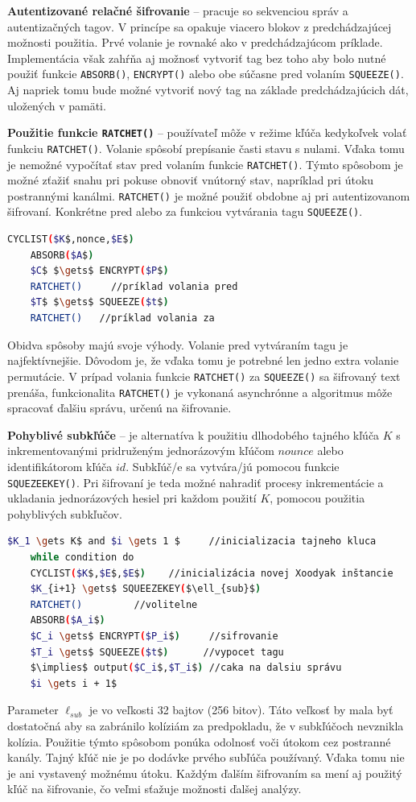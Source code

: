 \textbf{Autentizované relačné šifrovanie} -- pracuje so sekvenciou správ a autentizačných tagov. V princípe sa opakuje viacero blokov z predchádzajúcej možnosti použitia. Prvé volanie je rovnaké ako v predchádzajúcom príklade. Implementácia však zahŕňa aj možnosť vytvoriť tag bez toho aby bolo nutné použiť funkcie
\lstinline|ABSORB()|, \lstinline|ENCRYPT()| alebo obe súčasne pred volaním \lstinline|SQUEEZE()|. Aj napriek tomu bude možné vytvoriť nový tag na základe predchádzajúcich dát, uložených v pamäti. 	

\textbf{Použitie funkcie \lstinline|RATCHET()|} -- používateľ môže v režime kľúča kedykoľvek volať funkciu \lstinline|RATCHET()|. Volanie spôsobí prepísanie časti stavu s nulami. Vďaka tomu je nemožné vypočítať stav pred volaním funkcie \lstinline|RATCHET()|. Týmto spôsobom je možné zťažiť snahu pri pokuse obnoviť vnútorný stav, napríklad pri útoku postrannými kanálmi. \lstinline|RATCHET()| je možné použiť obdobne aj pri autentizovanom šifrovaní. Konkrétne pred alebo za funkciou vytvárania tagu \lstinline|SQUEEZE()|. 
\begin{lstlisting}[language=bash,mathescape=true]
	CYCLIST($K$,nonce,$E$)
	ABSORB($A$)
	$C$ $\gets$ ENCRYPT($P$)
	RATCHET()	  //príklad volania pred
	$T$ $\gets$ SQUEEZE($t$)
	RATCHET()   //príklad volania za
\end{lstlisting} 
Obidva spôsoby majú svoje výhody. Volanie pred vytváraním tagu je najfektívnejšie. Dôvodom je, že vďaka tomu je potrebné len jedno extra volanie permutácie. V prípad volania funkcie \lstinline|RATCHET()| za \lstinline|SQUEEZE()| sa šifrovaný text prenáša, funkcionalita \lstinline|RATCHET()| je vykonaná asynchrónne a algoritmus môže spracovať ďalšiu správu, určenú na šifrovanie. 

\textbf{Pohyblivé subkľúče} -- je alternatíva k použitiu dlhodobého tajného kľúča $K$ s inkrementovanými pridruženým jednorázovým kľúčom $nounce$ alebo identifikátorom kľúča $id$. Subkľúč/e sa vytvára/jú pomocou funkcie \lstinline|SQUEZEEKEY()|. Pri šifrovaní je teda možné nahradiť procesy inkrementácie a ukladania jednorázových hesiel pri každom použití  $K$, pomocou použitia pohyblivých subkľučov.\newpage
\begin{lstlisting}[language=bash,mathescape=true]
	$K_1 \gets K$ and $i \gets 1 $	   //inicializacia tajneho kluca
	while condition do 
	CYCLIST($K$,$E$,$E$)	//inicializácia novej Xoodyak inštancie
	$K_{i+1} \gets$ SQUEEZEKEY($\ell_{sub}$) 
	RATCHET()	      //volitelne
	ABSORB($A_i$)
	$C_i \gets$ ENCRYPT($P_i$)     //sifrovanie
	$T_i \gets$ SQUEEZE($t$)      //vypocet tagu
	$\implies$ output($C_i$,$T_i$) //caka na dalsiu správu
	$i \gets i + 1$
\end{lstlisting}     
Parameter $\ell_{sub}$ je vo veľkosti 32 bajtov (256 bitov). Táto veľkosť by mala byť dostatočná aby sa zabránilo kolíziám za predpokladu, že v subkľúčoch nevznikla kolízia. Použitie týmto spôsobom ponúka odolnosť voči útokom cez postranné kanály. Tajný kľúč nie je po dodávke prvého subľúča používaný. Vďaka tomu nie je ani vystavený možnému útoku. Každým ďalším šifrovaním sa mení aj použitý kľúč na šifrovanie, čo veľmi sťažuje možnosti ďalšej analýzy. 
 
